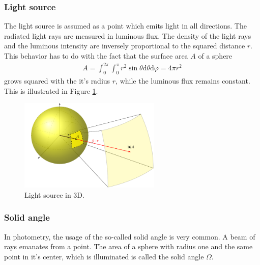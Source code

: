 \subsubsection{Light source}
The light source is assumed as a point which emits light in all directions.
The radiated light rays are measured in luminous flux. The density of the light rays and the luminous intensity are inversely proportional to the squared distance $r$.
This behavior has to do with the fact that the surface area $A$ of a sphere
\begin{align*}
A=\int_{0}^{2 \pi} \int_{0}^{\pi} r^{2} \sin \theta \text{d} \theta \text{d} \varphi=4 \pi r^{2}
\end{align*}
grows squared with the it's radius $r$, while the luminous flux remains constant.
This is illustrated in Figure \ref{theory:light}.
\begin{figure}[ht]
	\centering
	\includegraphics[width=0.6\textwidth]{2-theory/backlight/light.pdf}
	\caption{Light source in 3D.\label{theory:light}}
\end{figure} 

\subsubsection{Solid angle}
In photometry, the usage of the so-called solid angle is very common.
A beam of rays emanates from a point. The area of a sphere with radius one and the same point in it's center, which is illuminated is called the solid angle $\Omega$.
